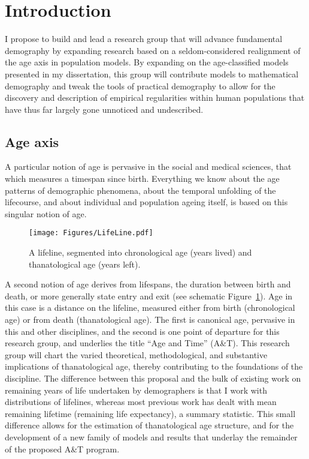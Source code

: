\documentclass[a4paper,12pt]{article}
\begin{document}
\section{Introduction}
I propose to build and lead a research group that will advance fundamental
demography by expanding research based on a seldom-considered realignment of
the age axis in population models. By expanding on the age-classified models
presented in my dissertation, this group will contribute models to
mathematical demography and tweak the tools of practical demography to allow for the discovery and description of empirical regularities within human populations that have thus far largely gone unnoticed and undescribed.

\subsection*{Age axis}
A particular notion of age is pervasive in the social and medical sciences, that
which measures a timespan since birth.
Everything we know about the age patterns of demographic phenomena, about the temporal
unfolding of the lifecourse, and about individual and population ageing itself,
is based on this singular notion of age. 

\begin{figure}[h]
\centering
	\caption{A lifeline, segmented into chronological age (years lived) and
	thanatological age (years left).}
	\label{fig:line}
	\texttt{[image: Figures/LifeLine.pdf]}	
\end{figure}

A second notion of age derives from lifespans, the duration between birth and
death, or more generally state entry and exit (see schematic
Figure~\ref{fig:line}).
Age in this case is a distance on the lifeline, measured either from birth (chronological age) or from death
(thanatological age). The first is canonical age, pervasive in this and
other disciplines, and the second is one point of departure for this research
group, and underlies the title ``Age and Time'' (A\&T). This research group
will chart the varied theoretical, methodological, and substantive
implications of thanatological age, thereby contributing to the foundations of
the discipline. The difference between this proposal and the bulk of existing
work on remaining years of life undertaken by demographers
\cite{sanderson2010remeasuring,sanderson2005average,sanderson2007new} is that I
work with distributions of lifelines, whereas most previous work has dealt with
mean remaining lifetime (remaining life expectancy), a summary statistic. This
small difference allows for the estimation of thanatological age structure, and
for the development of a new family of models and results that underlay the
remainder of the proposed A\&T program.
\end{document}
